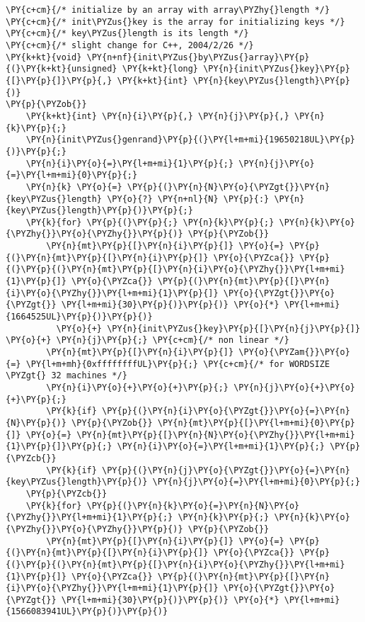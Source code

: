 \begin{Verbatim}[commandchars=\\\{\}]
\PY{c+cm}{/* initialize by an array with array\PYZhy{}length */}
\PY{c+cm}{/* init\PYZus{}key is the array for initializing keys */}
\PY{c+cm}{/* key\PYZus{}length is its length */}
\PY{c+cm}{/* slight change for C++, 2004/2/26 */}
\PY{k+kt}{void} \PY{n+nf}{init\PYZus{}by\PYZus{}array}\PY{p}{(}\PY{k+kt}{unsigned} \PY{k+kt}{long} \PY{n}{init\PYZus{}key}\PY{p}{[}\PY{p}{]}\PY{p}{,} \PY{k+kt}{int} \PY{n}{key\PYZus{}length}\PY{p}{)}
\PY{p}{\PYZob{}}
    \PY{k+kt}{int} \PY{n}{i}\PY{p}{,} \PY{n}{j}\PY{p}{,} \PY{n}{k}\PY{p}{;}
    \PY{n}{init\PYZus{}genrand}\PY{p}{(}\PY{l+m+mi}{19650218UL}\PY{p}{)}\PY{p}{;}
    \PY{n}{i}\PY{o}{=}\PY{l+m+mi}{1}\PY{p}{;} \PY{n}{j}\PY{o}{=}\PY{l+m+mi}{0}\PY{p}{;}
    \PY{n}{k} \PY{o}{=} \PY{p}{(}\PY{n}{N}\PY{o}{\PYZgt{}}\PY{n}{key\PYZus{}length} \PY{o}{?} \PY{n+nl}{N} \PY{p}{:} \PY{n}{key\PYZus{}length}\PY{p}{)}\PY{p}{;}
    \PY{k}{for} \PY{p}{(}\PY{p}{;} \PY{n}{k}\PY{p}{;} \PY{n}{k}\PY{o}{\PYZhy{}}\PY{o}{\PYZhy{}}\PY{p}{)} \PY{p}{\PYZob{}}
        \PY{n}{mt}\PY{p}{[}\PY{n}{i}\PY{p}{]} \PY{o}{=} \PY{p}{(}\PY{n}{mt}\PY{p}{[}\PY{n}{i}\PY{p}{]} \PY{o}{\PYZca{}} \PY{p}{(}\PY{p}{(}\PY{n}{mt}\PY{p}{[}\PY{n}{i}\PY{o}{\PYZhy{}}\PY{l+m+mi}{1}\PY{p}{]} \PY{o}{\PYZca{}} \PY{p}{(}\PY{n}{mt}\PY{p}{[}\PY{n}{i}\PY{o}{\PYZhy{}}\PY{l+m+mi}{1}\PY{p}{]} \PY{o}{\PYZgt{}}\PY{o}{\PYZgt{}} \PY{l+m+mi}{30}\PY{p}{)}\PY{p}{)} \PY{o}{*} \PY{l+m+mi}{1664525UL}\PY{p}{)}\PY{p}{)}
          \PY{o}{+} \PY{n}{init\PYZus{}key}\PY{p}{[}\PY{n}{j}\PY{p}{]} \PY{o}{+} \PY{n}{j}\PY{p}{;} \PY{c+cm}{/* non linear */}
        \PY{n}{mt}\PY{p}{[}\PY{n}{i}\PY{p}{]} \PY{o}{\PYZam{}}\PY{o}{=} \PY{l+m+mh}{0xffffffffUL}\PY{p}{;} \PY{c+cm}{/* for WORDSIZE \PYZgt{} 32 machines */}
        \PY{n}{i}\PY{o}{+}\PY{o}{+}\PY{p}{;} \PY{n}{j}\PY{o}{+}\PY{o}{+}\PY{p}{;}
        \PY{k}{if} \PY{p}{(}\PY{n}{i}\PY{o}{\PYZgt{}}\PY{o}{=}\PY{n}{N}\PY{p}{)} \PY{p}{\PYZob{}} \PY{n}{mt}\PY{p}{[}\PY{l+m+mi}{0}\PY{p}{]} \PY{o}{=} \PY{n}{mt}\PY{p}{[}\PY{n}{N}\PY{o}{\PYZhy{}}\PY{l+m+mi}{1}\PY{p}{]}\PY{p}{;} \PY{n}{i}\PY{o}{=}\PY{l+m+mi}{1}\PY{p}{;} \PY{p}{\PYZcb{}}
        \PY{k}{if} \PY{p}{(}\PY{n}{j}\PY{o}{\PYZgt{}}\PY{o}{=}\PY{n}{key\PYZus{}length}\PY{p}{)} \PY{n}{j}\PY{o}{=}\PY{l+m+mi}{0}\PY{p}{;}
    \PY{p}{\PYZcb{}}
    \PY{k}{for} \PY{p}{(}\PY{n}{k}\PY{o}{=}\PY{n}{N}\PY{o}{\PYZhy{}}\PY{l+m+mi}{1}\PY{p}{;} \PY{n}{k}\PY{p}{;} \PY{n}{k}\PY{o}{\PYZhy{}}\PY{o}{\PYZhy{}}\PY{p}{)} \PY{p}{\PYZob{}}
        \PY{n}{mt}\PY{p}{[}\PY{n}{i}\PY{p}{]} \PY{o}{=} \PY{p}{(}\PY{n}{mt}\PY{p}{[}\PY{n}{i}\PY{p}{]} \PY{o}{\PYZca{}} \PY{p}{(}\PY{p}{(}\PY{n}{mt}\PY{p}{[}\PY{n}{i}\PY{o}{\PYZhy{}}\PY{l+m+mi}{1}\PY{p}{]} \PY{o}{\PYZca{}} \PY{p}{(}\PY{n}{mt}\PY{p}{[}\PY{n}{i}\PY{o}{\PYZhy{}}\PY{l+m+mi}{1}\PY{p}{]} \PY{o}{\PYZgt{}}\PY{o}{\PYZgt{}} \PY{l+m+mi}{30}\PY{p}{)}\PY{p}{)} \PY{o}{*} \PY{l+m+mi}{1566083941UL}\PY{p}{)}\PY{p}{)}

\end{Verbatim}
